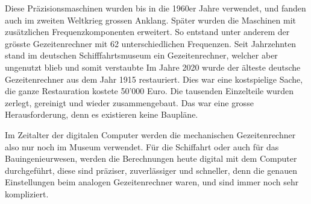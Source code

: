 Diese Präzisionsmaschinen wurden bis in die 1960er Jahre verwendet, und fanden auch im zweiten Weltkrieg grossen Anklang.
Später wurden die Maschinen mit zusätzlichen Frequenzkomponenten erweitert.
So entstand unter anderem der grösste Gezeitenrechner mit 62 unterschiedlichen Frequenzen.
Seit Jahrzehnten stand im deutschen Schifffahrtsmuseum ein Gezeitenrechner, welcher aber ungenutzt blieb und somit verstaubte
Im Jahre 2020 wurde der älteste deutsche Gezeitenrechner aus dem Jahr 1915 restauriert.
Dies war eine kostspielige Sache, die ganze Restauration kostete 50'000 Euro.
Die tausenden Einzelteile wurden zerlegt, gereinigt und wieder zusammengebaut.
Das war eine grosse Herausforderung, denn es existieren keine Baupläne.

Im Zeitalter der digitalen Computer werden die mechanischen Gezeitenrechner also nur noch im Museum verwendet.
Für die Schiffahrt oder auch für das Bauingenieurwesen, werden die Berechnungen heute digital mit dem Computer durchgeführt, diese sind präziser, zuverlässiger und schneller, denn die genauen Einstellungen beim analogen Gezeitenrechner waren, und sind immer noch sehr kompliziert.
